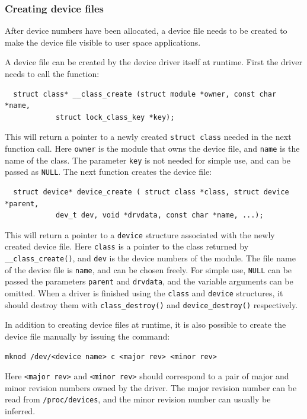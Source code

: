 \subsubsection{Creating device files}\label{sec:creating-device-files}
After device numbers have been allocated, a device file needs to be created to make the device file visible to user space applications.

A device file can be created by the device driver itself at runtime. First the driver needs to call the function:
\begin{verbatim}
  struct class* __class_create (struct module *owner, const char *name,
            struct lock_class_key *key);
\end{verbatim}
This will return a pointer to a newly created \texttt{struct class} needed in the next function call. Here \texttt{owner} is the module that owns the device file, and \texttt{name} is the name of the class. The parameter \texttt{key} is not needed for simple use, and can be passed as \texttt{NULL}. The next function creates the device file:
\begin{verbatim}
  struct device* device_create ( struct class *class, struct device *parent,
            dev_t dev, void *drvdata, const char *name, ...);
\end{verbatim}
This will return a pointer to a \texttt{device} structure associated with the newly created device file. Here \texttt{class} is a pointer to the class returned by \texttt{\_\_class\_create()}, and \texttt{dev} is the device numbers of the module. The file name of the device file is \texttt{name}, and can be chosen freely. For simple use, \texttt{NULL} can be passed the parameters \texttt{parent} and \texttt{drvdata}, and the variable arguments can be omitted. When a driver is finished using the \texttt{class} and \texttt{device} structures, it should destroy them with \texttt{class\_destroy()} and \texttt{device\_destroy()} respectively.

In addition to creating device files at runtime, it is also possible to create the device file manually by issuing the command:
\lstset{style=lststyle-terminal}
\begin{lstlisting}
mknod /dev/<device name> c <major rev> <minor rev>
\end{lstlisting}
Here \texttt{<major rev>} and \texttt{<minor rev>} should correspond to a pair of major and minor revision numbers owned by the driver. The major revision number can be read from \texttt{/proc/devices}, and the minor revision number can usually be inferred.

